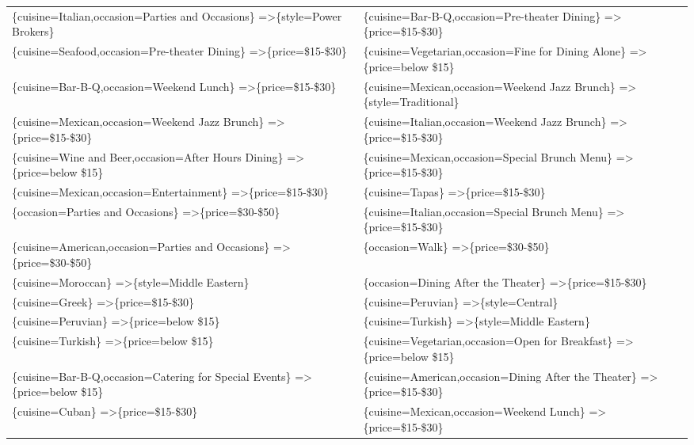 \documentclass[letterpaper,10pt]{article}
\begin{document}
\begin{appendices}
\begin{table}[h]
\begin{adjustbox}{max width=\textwidth}
\begin{tabular}{ll}
\{cuisine=Italian,occasion=Parties and Occasions\} =\textgreater \{style=Power Brokers\} & \{cuisine=Bar-B-Q,occasion=Pre-theater Dining\} =\textgreater \{price=\$15-\$30\} \\ 
\{cuisine=Seafood,occasion=Pre-theater Dining\} =\textgreater \{price=\$15-\$30\} & \{cuisine=Vegetarian,occasion=Fine for Dining Alone\} =\textgreater \{price=below \$15\} \\ 
\{cuisine=Bar-B-Q,occasion=Weekend Lunch\} =\textgreater \{price=\$15-\$30\} & \{cuisine=Mexican,occasion=Weekend Jazz Brunch\} =\textgreater \{style=Traditional\} \\ 
\{cuisine=Mexican,occasion=Weekend Jazz Brunch\} =\textgreater \{price=\$15-\$30\} & \{cuisine=Italian,occasion=Weekend Jazz Brunch\} =\textgreater \{price=\$15-\$30\} \\ 
\{cuisine=Wine and Beer,occasion=After Hours Dining\} =\textgreater \{price=below \$15\} & \{cuisine=Mexican,occasion=Special Brunch Menu\} =\textgreater \{price=\$15-\$30\} \\ 
\{cuisine=Mexican,occasion=Entertainment\} =\textgreater \{price=\$15-\$30\} & \{cuisine=Tapas\} =\textgreater \{price=\$15-\$30\} \\ 
\{occasion=Parties and Occasions\} =\textgreater \{price=\$30-\$50\} & \{cuisine=Italian,occasion=Special Brunch Menu\} =\textgreater \{price=\$15-\$30\} \\ 
\{cuisine=American,occasion=Parties and Occasions\} =\textgreater \{price=\$30-\$50\} & \{occasion=Walk\} =\textgreater \{price=\$30-\$50\} \\ 
\{cuisine=Moroccan\} =\textgreater \{style=Middle Eastern\} & \{occasion=Dining After the Theater\} =\textgreater \{price=\$15-\$30\} \\ 
\{cuisine=Greek\} =\textgreater \{price=\$15-\$30\} & \{cuisine=Peruvian\} =\textgreater \{style=Central\} \\ 
\{cuisine=Peruvian\} =\textgreater \{price=below \$15\} & \{cuisine=Turkish\} =\textgreater \{style=Middle Eastern\} \\ 
\{cuisine=Turkish\} =\textgreater \{price=below \$15\} & \{cuisine=Vegetarian,occasion=Open for Breakfast\} =\textgreater \{price=below \$15\} \\ 
\{cuisine=Bar-B-Q,occasion=Catering for Special Events\} =\textgreater \{price=below \$15\} & \{cuisine=American,occasion=Dining After the Theater\} =\textgreater \{price=\$15-\$30\} \\ 
\{cuisine=Cuban\} =\textgreater \{price=\$15-\$30\} & \{cuisine=Mexican,occasion=Weekend Lunch\} =\textgreater \{price=\$15-\$30\} \\ 

\end{tabular}
\end{adjustbox}
\end{table}
\end{appendices}
\end{document}
